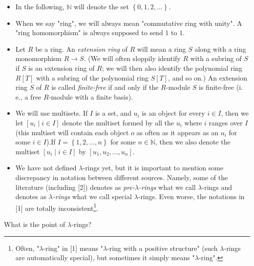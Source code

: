 \documentclass[12pt,final,notitlepage,onecolumn,german]{article}%
\begin{document}
\begin{itemize}
\item In the following, $\mathbb{N}$ will denote the set $\left\{
0,1,2,...\right\}  $.

\item When we say "ring", we will always mean "commutative ring with unity". A
"ring homomorphism" is always supposed to send $1$ to $1$.

\item Let $R$ be a ring. An \textit{extension ring} of $R$ will mean a ring
$S$ along with a ring monomorphism $R\rightarrow S$. (We will often sloppily
identify $R$ with a subring of $S$ if $S$ is an extension ring of $R$; we will
then also identify the polynomial ring $R\left[  T\right]  $ with a subring of
the polynomial ring $S\left[  T\right]  $, and so on.) An extension ring $S$
of $R$ is called \textit{finite-free} if and only if the $R$-module $S$ is
finite-free (i. e., a free $R$-module with a finite basis).

\item We will use multisets. If $I$ is a set, and $u_{i}$ is an object for
every $i\in I$, then we let $\left[  u_{i}\mid i\in I\right]  $ denote the
multiset formed by all the $u_{i}$ where $i$ ranges over $I$ (this multiset
will contain each object $o$ as often as it appears as an $u_{i}$ for some
$i\in I$).\newline If $I=\left\{  1,2,...,n\right\}  $ for some $n\in
\mathbb{N}$, then we also denote the multiset $\left[  u_{i}\mid i\in
I\right]  $ by $\left[  u_{1},u_{2},...,u_{n}\right]  $.

\item We have not defined $\lambda$-rings yet, but it is important to mention
some discrepancy in notation between different sources. Namely, some of the
literature (including [2]) denotes as \textit{pre-}$\lambda$\textit{-rings}
what we call $\lambda$-rings and denotes as $\lambda$\textit{-rings} what we
call special $\lambda$-rings. Even worse, the notations in [1] are totally
inconsistent\footnote{Often, "$\lambda$-ring" in [1] means "$\lambda$-ring
with a positive structure" (such $\lambda$-rings are automatically special),
but sometimes it simply means "$\lambda$-ring".}.
\end{itemize}

\begin{center}
\end{center}

What is the point of $\lambda$-rings?
\end{document}
